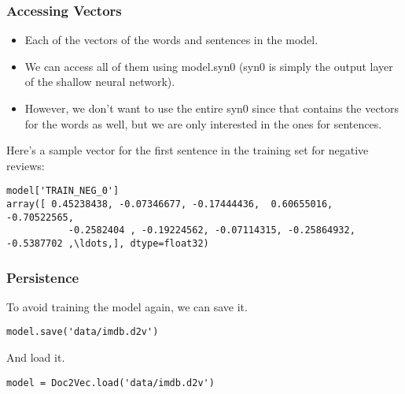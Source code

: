 \begin{frame}[fragile]\frametitle{Accessing Vectors}
\begin{itemize}
\item Each of the vectors of the words and sentences in the model. 
\item We can access all of them using model.syn0 (syn0 is simply the output layer of the shallow neural network). 
\item However, we don't want to use the entire syn0 since that contains the vectors for the words as well, but we are only interested in the ones for sentences.
\end{itemize}

Here's a sample vector for the first sentence in the training set for negative reviews:
\begin{lstlisting}
model['TRAIN_NEG_0']
array([ 0.45238438, -0.07346677, -0.17444436,  0.60655016, -0.70522565,
           -0.2582404 , -0.19224562, -0.07114315, -0.25864932, -0.5387702 ,\ldots,], dtype=float32)
\end{lstlisting}
\end{frame}

\begin{frame}[fragile]\frametitle{Persistence}
To avoid training the model again, we can save it.
\begin{lstlisting}
model.save('data/imdb.d2v')
\end{lstlisting}

And load it.
\begin{lstlisting}
model = Doc2Vec.load('data/imdb.d2v')
\end{lstlisting}
\end{frame}


